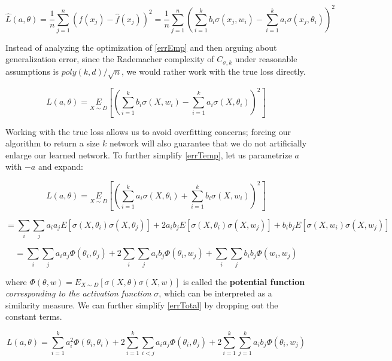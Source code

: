 \documentclass[11pt]{article}
\begin{document}
\begin{equation}\label{errEmp}
\widehat{L}(a,\theta) = \frac{1}{n}\sum_{j=1}^n (f(x_j) - \widehat{f}(x_j))^2 = \frac{1}{n}\sum_{j=1}^n \left(\sum_{i=1}^k b_i\sigma(x_j,w_i) - \sum_{i=1}^k a_i \sigma(x_j,\theta_i)\right)^2
\end{equation}



Instead of analyzing the optimization of \eqref{errEmp} and then arguing about generalization error, since the Rademacher complexity of $C_{\sigma, k}$ under reasonable assumptions is  $poly(k, d)/\sqrt{n}$, we would rather work with the true loss directly.


\begin{equation}\label{errTemp}
L(a,\theta)  = \underset{X\sim D}{E}\left[ \left(\sum_{i=1}^k b_i\sigma(X,w_i) - \sum_{i=1}^k a_i \sigma(X,\theta_i)\right)^2\right]
\end{equation}

Working with the true loss allows us to avoid overfitting concerns; forcing our algorithm to return a size $k$ network will also guarantee that we do not artificially enlarge our learned network. To further simplify \eqref{errTemp}, let us parametrize $a$ with $-a$ and expand:


\begin{equation*}
L(a,\theta)  = \underset{X\sim D}{E}\left[ \left(  \sum_{i=1}^k a_i \sigma(X,\theta_i) + \sum_{i=1}^k b_i\sigma(X,w_i)\right)^2\right]
\end{equation*}


\begin{equation*}
= \sum_{i} \sum_{j} a_i a_j E[\sigma(X,\theta_i)\sigma(X,\theta_j)]  + 2 a_ib_j E[\sigma(X,\theta_i)\sigma(X,w_j)] + b_ib_jE[\sigma(X,w_i)\sigma(X,w_j)] 
\end{equation*}

\begin{equation}\label{errTotal}
= \sum_{i} \sum_{j} a_i a_j \Phi(\theta_i,\theta_j)  + 2 \sum_{i} \sum_{j}a_ib_j \Phi(\theta_i,w_j) + \sum_{i} \sum_{j} b_ib_j\Phi(w_i,w_j) 
\end{equation}


where $\Phi(\theta, w) = E_{X\sim D}[ \sigma(X,\theta) \sigma(X,w)]$ is called the {\bf potential function} {\it corresponding to the activation function} $\sigma$, which can be interpreted as a similarity measure. We can further simplify \eqref{errTotal} by dropping out the constant terms.

\begin{equation}\label{errLoss}
L(a,\theta) = \sum_{i=1}^k a_i^2 \Phi(\theta_i,\theta_i) + 2\sum_{i=1}^k\sum_{i < j} a_i a_j \Phi(\theta_i,\theta_j) + 2\sum_{i=1}^k\sum_{j=1}^k a_ib_j \Phi(\theta_i,w_j)
\end{equation}
\end{document}
